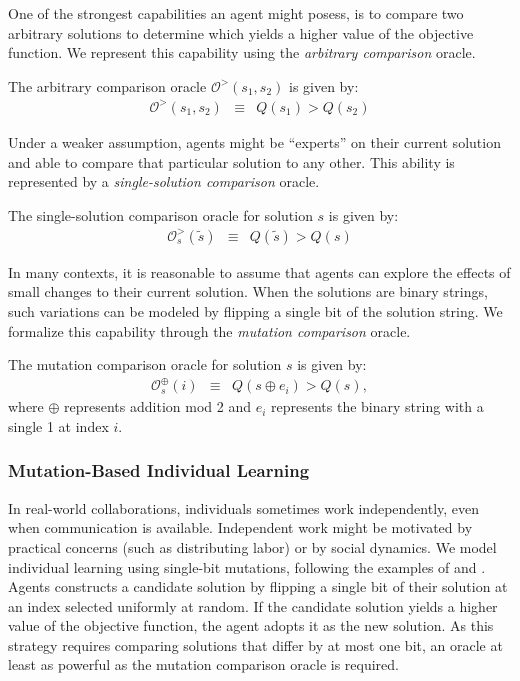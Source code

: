 One of the strongest capabilities an agent might posess, is to compare two arbitrary solutions to determine which yields a higher value of the objective function. We represent this capability using the {\em arbitrary comparison} oracle.
\begin{definition}
The arbitrary comparison oracle $\mathcal{O^>}(s_1, s_2)$ is given by:
\begin{eqnarray}
\mathcal{O}^>(s_1, s_2) &\equiv&
Q(s_1) > Q(s_2)
\end{eqnarray}
\end{definition}

Under a weaker assumption, agents might be ``experts'' on their current solution and able to compare that particular solution to any other. This ability is represented by a {\em single-solution comparison} oracle.
\begin{definition}
The single-solution comparison oracle for solution $s$ is given by:
\begin{eqnarray}
\mathcal{O}^>_s(\tilde{s}) &\equiv&
Q(\tilde{s}) > Q(s)
\end{eqnarray}
\end{definition}

In many contexts, it is reasonable to assume that agents can explore the effects of small changes to their current solution. When the solutions are binary strings, such variations can be modeled by flipping a single bit of the solution string. We formalize this capability through the {\em mutation comparison} oracle.
\begin{definition}
The mutation comparison oracle for solution $s$ is given by:
\begin{eqnarray}
\mathcal{O}^\oplus_s(i) &\equiv&
Q(s \oplus e_i) > Q(s),
\end{eqnarray}
where $\oplus$ represents addition mod 2 and $e_i$ represents the binary string with a single 1 at index $i$.
\end{definition}

\subsubsection{Mutation-Based Individual Learning}
In real-world collaborations, individuals sometimes work independently, even when communication is available. Independent work might be motivated by practical concerns (such as distributing labor) or by social dynamics. We model individual learning using single-bit mutations, following the examples of
\cite{lazer_network_2007} and \cite{barkoczi_social_2016}. Agents constructs a candidate solution by flipping a single bit of their solution at an index selected uniformly at random. If the candidate solution yields a higher value of the objective function, the agent adopts it as the new solution. As this strategy requires comparing solutions that differ by at most one bit, an oracle at least as powerful as the mutation comparison oracle is required.

